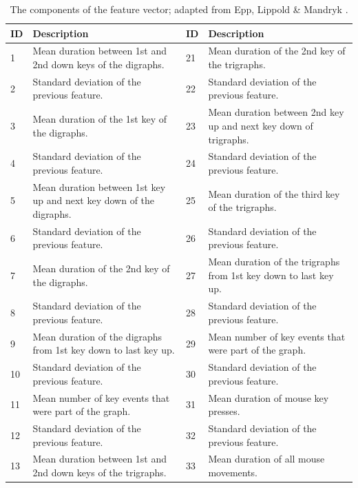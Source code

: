 \documentclass[a4paper,twoside]{article}
\begin{document}
\begin{table}[!t]
\centering
\caption{The components of the feature vector; adapted from Epp, Lippold \& Mandryk \cite{epp2011identifying}.}
\label{tab_features}
    \begin{tabular}{ | l |p{} || l | p{} | }
    \hline
    ID          & Description           & ID               & Description  \\
    \hline
    1 & Mean duration between 1st and 2nd down keys of the digraphs.  & 21 & Mean duration of the 2nd key of the trigraphs.\\
    \hline
    2 & Standard deviation of the previous feature.                   & 22 & Standard deviation of the previous feature.\\
    \hline
    3 & Mean duration of the 1st key of the digraphs.                 & 23 & Mean duration between 2nd key up and next key down of trigraphs.\\
    \hline
    4 & Standard deviation of the previous feature.                   & 24 & Standard deviation of the previous feature.\\
    \hline
    5 & Mean duration between 1st key up and next key down of the digraphs. & 25 & Mean duration of the third key of the trigraphs.\\
    \hline
    6 & Standard deviation of the previous feature. & 26 & Standard deviation of the previous feature.\\
    \hline
    7 & Mean duration of the 2nd key of the digraphs. & 27 & Mean duration of the trigraphs from 1st key down to last key up.\\
    \hline
    8 & Standard deviation of the previous feature. & 28 & Standard deviation of the previous feature.\\
    \hline
    9 & Mean duration of the digraphs from 1st key down to last key up. & 29 & Mean number of key events that were part of the graph.\\
    \hline
    10 & Standard deviation of the previous feature. & 30 & Standard deviation of the previous feature.\\
    \hline
    11 & Mean number of key events that were part of the graph. & 31 & Mean duration of mouse key presses.\\
    \hline
    12 & Standard deviation of the previous feature. & 32 & Standard deviation of the previous feature.\\
    \hline
    13 & Mean duration between 1st and 2nd down keys of the trigraphs. & 33 & Mean duration of all mouse movements.\\

\end{tabular}
\end{table}
\end{document}
